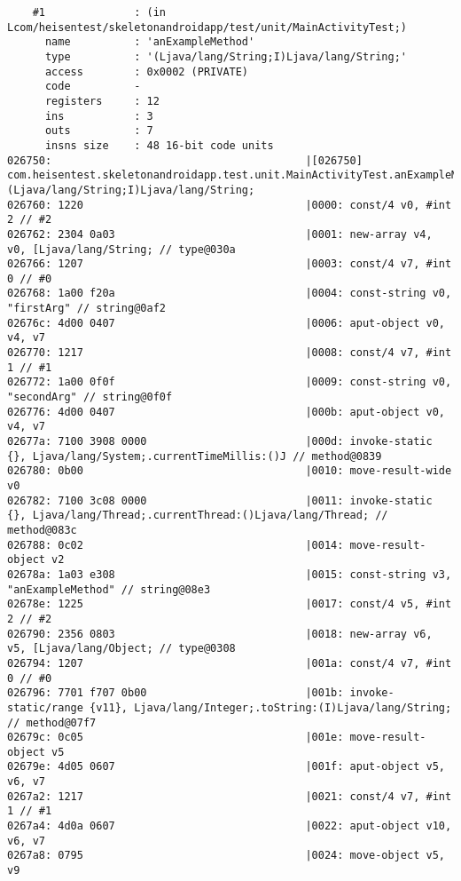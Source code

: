 \begin{lstlisting}
    #1              : (in Lcom/heisentest/skeletonandroidapp/test/unit/MainActivityTest;)
      name          : 'anExampleMethod'
      type          : '(Ljava/lang/String;I)Ljava/lang/String;'
      access        : 0x0002 (PRIVATE)
      code          -
      registers     : 12
      ins           : 3
      outs          : 7
      insns size    : 48 16-bit code units
026750:                                        |[026750] com.heisentest.skeletonandroidapp.test.unit.MainActivityTest.anExampleMethod:(Ljava/lang/String;I)Ljava/lang/String;
026760: 1220                                   |0000: const/4 v0, #int 2 // #2
026762: 2304 0a03                              |0001: new-array v4, v0, [Ljava/lang/String; // type@030a
026766: 1207                                   |0003: const/4 v7, #int 0 // #0
026768: 1a00 f20a                              |0004: const-string v0, "firstArg" // string@0af2
02676c: 4d00 0407                              |0006: aput-object v0, v4, v7
026770: 1217                                   |0008: const/4 v7, #int 1 // #1
026772: 1a00 0f0f                              |0009: const-string v0, "secondArg" // string@0f0f
026776: 4d00 0407                              |000b: aput-object v0, v4, v7
02677a: 7100 3908 0000                         |000d: invoke-static {}, Ljava/lang/System;.currentTimeMillis:()J // method@0839
026780: 0b00                                   |0010: move-result-wide v0
026782: 7100 3c08 0000                         |0011: invoke-static {}, Ljava/lang/Thread;.currentThread:()Ljava/lang/Thread; // method@083c
026788: 0c02                                   |0014: move-result-object v2
02678a: 1a03 e308                              |0015: const-string v3, "anExampleMethod" // string@08e3
02678e: 1225                                   |0017: const/4 v5, #int 2 // #2
026790: 2356 0803                              |0018: new-array v6, v5, [Ljava/lang/Object; // type@0308
026794: 1207                                   |001a: const/4 v7, #int 0 // #0
026796: 7701 f707 0b00                         |001b: invoke-static/range {v11}, Ljava/lang/Integer;.toString:(I)Ljava/lang/String; // method@07f7
02679c: 0c05                                   |001e: move-result-object v5
02679e: 4d05 0607                              |001f: aput-object v5, v6, v7
0267a2: 1217                                   |0021: const/4 v7, #int 1 // #1
0267a4: 4d0a 0607                              |0022: aput-object v10, v6, v7
0267a8: 0795                                   |0024: move-object v5, v9

\end{lstlisting}
